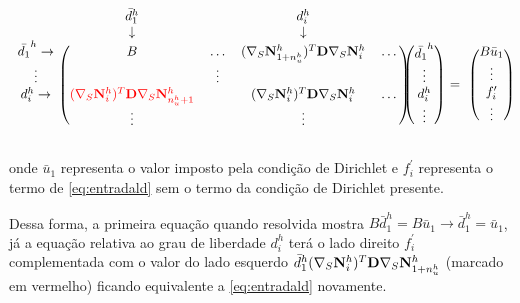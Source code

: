 \begin{equation} \label{eq:bigconst}
\begin{blockarray}{ccccc}
& \bar{d}_1^h &  & d_i ^h & & \\
& \downarrow &  & \downarrow & & \\
\begin{block}{c(cccc)}
\bar{d_1}^h \rightarrow & B & \hdots &  \kij{1+\qtdfreedomfine}{i}  & \hdots \\
\vdots                  &   & \vdots &             \\
d_i^h       \rightarrow &{ \color{red}\kij{i}{n_u^h + 1} }  &      & \kij{i}{i}   & \hdots \\
& \vdots &      & \vdots   &  \\
\end{block}
\end{blockarray} \begin{blockarray}{c}
 \\
 \\
\begin{block}{(c)}
\bar{d_1}^h \\
\vdots\\
d_i^h \\
\vdots  \\
\end{block}
\end{blockarray}\begin{blockarray}{c}
 \\
 \\
 \\
= \\
 \\
\end{blockarray} \begin{blockarray}{c}
 \\
 \\
\begin{block}{(c)}
 B \bar{u}_1 \\
\vdots\\
f^\prime_i \\
\vdots  \\
\end{block}
\end{blockarray}
\end{equation}


onde $\bar{u}_1$ representa o valor imposto pela condição de Dirichlet e $f^\prime_i$ representa o termo de \eqref{eq:entradald} sem o termo da condição de Dirichlet presente.

Dessa forma, a primeira equação quando resolvida mostra $B\bar{d}_1^h = B\bar{u}_1 \rightarrow \bar{d}_1^h = \bar{u}_1$, já a equação relativa ao grau de liberdade $d_i^h$ terá o lado direito $f^\prime_i$ complementada com o valor do lado esquerdo $\bar{d}_1^h (\nabla_S {\mathbf{N}_{i}^h})^T \mathbf{D} \nabla_S {\mathbf{N}_{1+n_u^h}^h}$ (marcado em vermelho) ficando equivalente a \eqref{eq:entradald} novamente.

